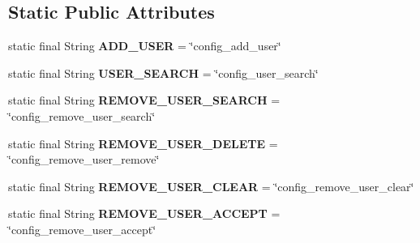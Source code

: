\subsection*{Static Public Attributes}
\begin{DoxyCompactItemize}
\item 
\hypertarget{classw3se_1_1_controller_1_1_config_view_controller_a362ae896ec3efea81335c620cc647745}{static final String {\bfseries A\-D\-D\-\_\-\-U\-S\-E\-R} = \char`\"{}config\-\_\-add\-\_\-user\char`\"{}}\label{classw3se_1_1_controller_1_1_config_view_controller_a362ae896ec3efea81335c620cc647745}

\item 
\hypertarget{classw3se_1_1_controller_1_1_config_view_controller_a887e1127a43b0a56c4b6dec9424289e1}{static final String {\bfseries U\-S\-E\-R\-\_\-\-S\-E\-A\-R\-C\-H} = \char`\"{}config\-\_\-user\-\_\-search\char`\"{}}\label{classw3se_1_1_controller_1_1_config_view_controller_a887e1127a43b0a56c4b6dec9424289e1}

\item 
\hypertarget{classw3se_1_1_controller_1_1_config_view_controller_a791ea02e848585e82ef32ed2ae17abf8}{static final String {\bfseries R\-E\-M\-O\-V\-E\-\_\-\-U\-S\-E\-R\-\_\-\-S\-E\-A\-R\-C\-H} = \char`\"{}config\-\_\-remove\-\_\-user\-\_\-search\char`\"{}}\label{classw3se_1_1_controller_1_1_config_view_controller_a791ea02e848585e82ef32ed2ae17abf8}

\item 
\hypertarget{classw3se_1_1_controller_1_1_config_view_controller_a202fda5390e97026674859685ad9c09e}{static final String {\bfseries R\-E\-M\-O\-V\-E\-\_\-\-U\-S\-E\-R\-\_\-\-D\-E\-L\-E\-T\-E} = \char`\"{}config\-\_\-remove\-\_\-user\-\_\-remove\char`\"{}}\label{classw3se_1_1_controller_1_1_config_view_controller_a202fda5390e97026674859685ad9c09e}

\item 
\hypertarget{classw3se_1_1_controller_1_1_config_view_controller_a41837debf3749fc8957aea5d867d665d}{static final String {\bfseries R\-E\-M\-O\-V\-E\-\_\-\-U\-S\-E\-R\-\_\-\-C\-L\-E\-A\-R} = \char`\"{}config\-\_\-remove\-\_\-user\-\_\-clear\char`\"{}}\label{classw3se_1_1_controller_1_1_config_view_controller_a41837debf3749fc8957aea5d867d665d}

\item 
\hypertarget{classw3se_1_1_controller_1_1_config_view_controller_a9d77e3de71813a3c081a30c567f5add7}{static final String {\bfseries R\-E\-M\-O\-V\-E\-\_\-\-U\-S\-E\-R\-\_\-\-A\-C\-C\-E\-P\-T} = \char`\"{}config\-\_\-remove\-\_\-user\-\_\-accept\char`\"{}}\label{classw3se_1_1_controller_1_1_config_view_controller_a9d77e3de71813a3c081a30c567f5add7}


\end{DoxyCompactItemize}
